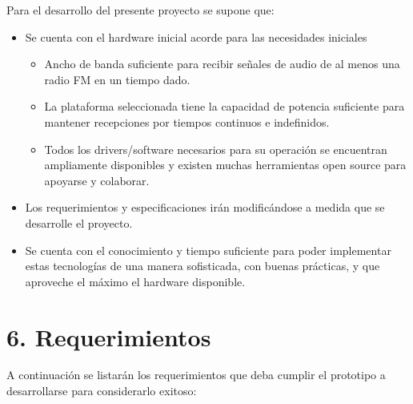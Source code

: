 \documentclass[
11pt, %
codirector, %
]{charter}
\begin{document}
Para el desarrollo del presente proyecto se supone que:

\begin{itemize}
	\item Se cuenta con el hardware inicial acorde para las necesidades iniciales
		\begin{itemize}
		\item Ancho de banda suficiente para recibir señales de audio de al menos una radio FM en un tiempo dado.
		\item La plataforma seleccionada tiene la capacidad de potencia suficiente para mantener recepciones por tiempos continuos e indefinidos.
		\item Todos los drivers/software necesarios para su operación se encuentran ampliamente disponibles y existen muchas herramientas open source para apoyarse y colaborar.
		\end{itemize}
	\item Los requerimientos y especificaciones irán modificándose a medida que se desarrolle el proyecto.
	\item Se cuenta con el conocimiento y tiempo suficiente para poder implementar estas tecnologías de una manera sofisticada, con buenas prácticas, y que aproveche el máximo el hardware disponible.
\end{itemize}

\section{6. Requerimientos}
\label{sec:requerimientos}

A continuación se listarán los requerimientos que deba cumplir el prototipo a desarrollarse para considerarlo exitoso:
\end{document}
